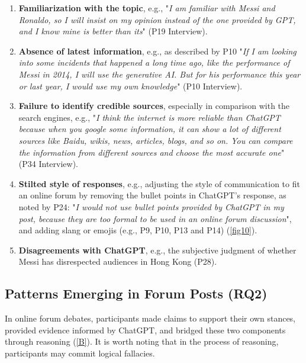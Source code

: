 \begin{enumerate}
\item{\textbf{Familiarization with the topic}, e.g., "\textit{I am familiar with Messi and Ronaldo, so I will insist on my opinion instead of the one provided by GPT, and I know mine is better than its}" (P19 Interview).}

\item{\textbf{Absence of latest information}, e.g., as described by P10 "\textit{If I am looking into some incidents that happened a long time ago, like the performance of Messi in 2014, I will use the generative AI. But for his performance this year or last year, I would use my own knowledge}" (P10 Interview).}

\item{\textbf{Failure to identify credible sources}, especially in comparison with the search engines, e.g., "\textit{I think the internet is more reliable than ChatGPT because when you google some information, it can show a lot of different sources like Baidu, wikis, news, articles, blogs, and so on. You can compare the information from different sources and choose the most accurate one}" (P34 Interview).}

\item{\textbf{Stilted style of responses}, e.g., adjusting the style of communication to fit an online forum by removing the bullet points in ChatGPT's response, as noted by P24: "\textit{I would not use bullet points provided by ChatGPT in my post, because they are too formal to be used in an online forum discussion}", and adding slang or emojis (e.g., P9, P10, P13 and P14) (\autoref{fig10}).}

\item{\textbf{Disagreements with ChatGPT}, e.g., the subjective judgment of whether Messi has disrespected audiences in Hong Kong (P28).}
\end{enumerate}





\subsection{Patterns Emerging in Forum Posts (RQ2)}

In online forum debates, participants made claims to support their own stances, provided evidence informed by ChatGPT, and bridged these two components through reasoning (\autoref{B}). It is worth noting that in the process of reasoning, participants may commit logical fallacies.

